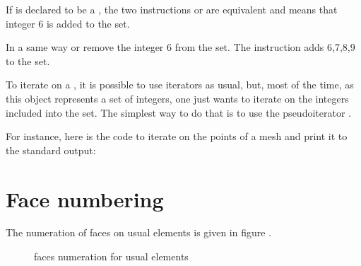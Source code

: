 \documentclass[a4paper,11pt,english]{sphinxmanual}
\begin{document}
If  is declared to be a , the two
instructions  or  are equivalent and
means that integer 6 is added to the set.

In a same way  or  remove the integer 6
from the set. The instruction  adds 6,7,8,9 to the
set.

To iterate on a , it is possible to use iterators
as usual, but, most of the time, as this object represents a set of
integers, one just wants to iterate on the integers included into the
set. The simplest way to do that is to use the pseudo\sphinxhyphen{}iterator
.

For instance, here is the code to iterate on the points of a mesh and
print it to the standard output:

\begin{sphinxVerbatim}[commandchars=\\\{\}]
    
          \PYG{p}{[}\PYG{p}{]}  
\end{sphinxVerbatim}


\section{Face numbering}
\label{\detokenize{userdoc/bmesh:face-numbering}}
The numeration of faces on usual elements is given in figure {\hyperref[\detokenize{userdoc/bmesh:ud-fig-elemf}]{}}.

\begin{figure}[htbp]
\centering
\capstart

\noindent{}
\caption{faces numeration for usual elements}\label{\detokenize{userdoc/bmesh:id3}}\label{\detokenize{userdoc/bmesh:ud-fig-elemf}}\end{figure}
\end{document}
